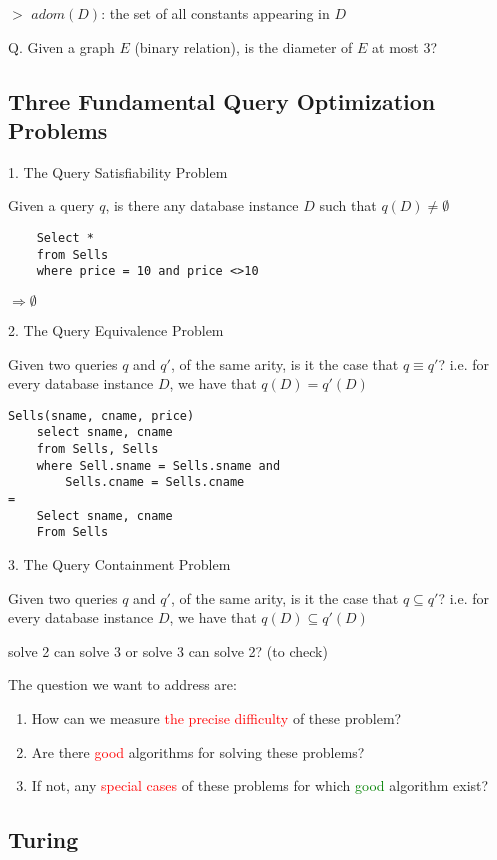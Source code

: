\documentclass[12pt,a4paper]{article}
\newcommand{\remark}[1]{
    $>$ {\color{blue} #1}
}
\begin{document}
\remark{\(adom(D)\): the set of all constants appearing in \(D\)}

Q. Given a graph $E$ (binary relation), is the diameter of $E$ at most 3?

\subsection*{Three Fundamental Query Optimization Problems}

1. The Query Satisfiability Problem

Given a query $q$, is there any database instance $D$ such that $q(D) \neq \emptyset$

\begin{verbatim}
    Select *
    from Sells
    where price = 10 and price <>10
\end{verbatim}

$\Rightarrow \emptyset$

2. The Query Equivalence Problem

Given two queries $q$ and $q'$, of the same arity, 
is it the case that $q \equiv q'$? i.e. for every database instance $D$, 
we have that $q(D) = q'(D)$

\begin{verbatim}
Sells(sname, cname, price)
    select sname, cname
    from Sells, Sells
    where Sell.sname = Sells.sname and
        Sells.cname = Sells.cname
=
    Select sname, cname
    From Sells
\end{verbatim}

3. The Query Containment Problem

Given two queries $q$ and $q'$, of the same arity, 
is it the case that $q \subseteq q'$? i.e. for every database instance $D$, 
we have that $q(D) \subseteq q'(D)$

solve 2 can solve 3 or solve 3 can solve 2? (to check)

The question we want to address are:

\begin{enumerate}
    \item How can we measure \textcolor{red}{the precise difficulty} of these problem?
    \item Are there \textcolor{red}{good} algorithms for solving these problems?
    \item If not, any \textcolor{red}{special cases} of these problems for which \textcolor{green}{good} algorithm exist?
\end{enumerate}

\subsection*{Turing}
\end{document}
